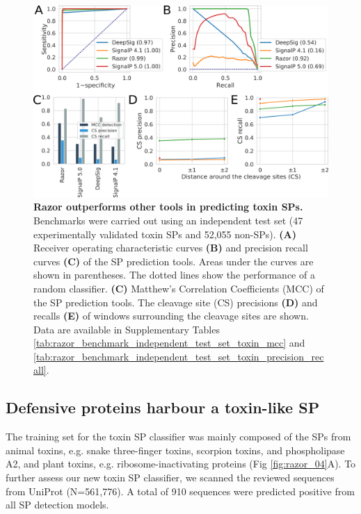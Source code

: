 \begin{figure}[!hbtp]
\centerline{\includegraphics[width=1\textwidth]{chapters/Signal_Peptide/Figures/fig3_new_benchmarking_cleavage_sites_with_toxin.png}}
\caption[Razor outperforms other tools in predicting toxin SPs. ]{\textbf{Razor outperforms other tools in predicting toxin SPs. } Benchmarks were carried out using an independent test set (47 experimentally validated toxin SPs and 52,055 non-SPs). \textbf{(A)} Receiver operating characteristic curves \textbf{(B)}  and precision recall curves \textbf{(C)}  of the SP prediction tools. Areas under the curves are shown in parentheses. The dotted lines show the performance of a random classifier. \textbf{(C)}  Matthew’s Correlation Coefficients (MCC) of the SP prediction tools. The cleavage site (CS) precisions \textbf{(D)}  and recalls \textbf{(E)}  of windows surrounding the cleavage sites are shown. Data are available in Supplementary Tables \ref{tab:razor_benchmark_independent_test_set_toxin_mcc} and \ref{tab:razor_benchmark_independent_test_set_toxin_precision_recall}.
}\label{fig:razor_03}
\end{figure}


\subsection{Defensive proteins harbour a toxin-like SP}
The training set for the toxin SP classifier was mainly composed of the SPs from animal toxins, e.g. snake three-finger toxins, scorpion toxins, and phospholipase A2, and plant toxins, e.g. ribosome-inactivating proteins (Fig \ref{fig:razor_04}A). To further assess our new toxin SP classifier, we scanned the reviewed sequences from UniProt (N=561,776). A total of 910 sequences were predicted positive from all SP detection models. 

